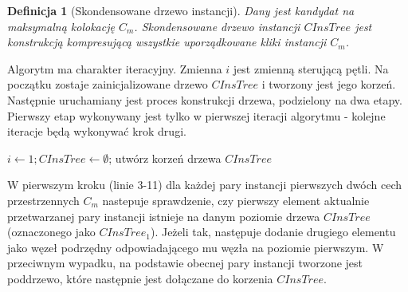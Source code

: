 \documentclass[12pt]{article}
\newtheorem{defin}{Definicja}
\begin{document}
\begin{defin}[Skondensowane drzewo instancji]Dany jest kandydat na maksymalną kolokację $ C_{m} $. Skondensowane drzewo instancji $ CInsTree$ jest konstrukcją kompresującą wszystkie uporządkowane kliki instancji $ C_{m} $.
\end{defin}

Algorytm ma charakter iteracyjny. Zmienna $ i $ jest zmienną sterującą pętli. Na początku zostaje zainicjalizowane drzewo $ CInsTree $ i tworzony jest jego korzeń. Następnie uruchamiany jest proces konstrukcji drzewa, podzielony na dwa etapy. Pierwszy etap wykonywany jest tylko w pierwszej iteracji algorytmu - kolejne iteracje będą wykonywać krok drugi. 

\begin{algorithm}
$ i \leftarrow 1; CInsTree \leftarrow \emptyset$; utwórz korzeń drzewa $ CInsTree $\;
\caption{Konstrukcja skondensowanego drzewa instancji $ C_{m} $}
\end{algorithm}

W pierwszym kroku (linie 3-11) dla każdej pary instancji pierwszych dwóch cech przestrzennych $ C_{m} $ nastepuje sprawdzenie, czy pierwszy element aktualnie przetwarzanej pary instancji istnieje na danym poziomie drzewa $ CInsTree $ (oznaczonego jako $CInsTree_{1}$). Jeżeli tak, następuje dodanie drugiego elementu jako węzeł podrzędny odpowiadającego mu węzła na poziomie pierwszym. W przeciwnym wypadku, na podstawie obecnej pary instancji tworzone jest poddrzewo, które następnie jest dołączane do korzenia $ CInsTree $. 
\end{document}
